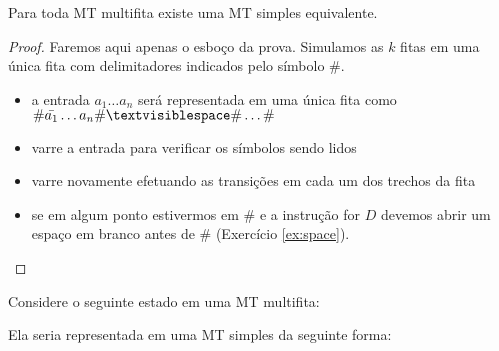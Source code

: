 \begin{theorem}
  \label{theo:multifita}
  Para toda MT multifita existe uma MT simples equivalente.
\end{theorem}
\begin{proof}
  Faremos aqui apenas o esboço da prova.
  Simulamos as $k$ fitas em uma única fita com delimitadores indicados pelo símbolo $\#$.
  \begin{itemize}
  \item a entrada $a_1 \dots a_n$ será representada em uma única fita como $\# \bar{a_1} \dots a_n \# \textvisiblespace \# \dots \#$
  \item varre a entrada para verificar os símbolos sendo lidos
  \item varre novamente efetuando as transições em cada um dos trechos da fita
  \item se em algum ponto estivermos em $\#$ e a instrução for $D$ devemos abrir um espaço em branco antes de $\#$ (Exercício \ref{ex:space}).
  \end{itemize}
\end{proof}

\begin{example}
  Considere o seguinte estado em uma MT multifita: 
  \begin{center}
  \end{center}

  Ela seria representada em uma MT simples da seguinte forma:

  \begin{center}
  \end{center}
  
\end{example}

